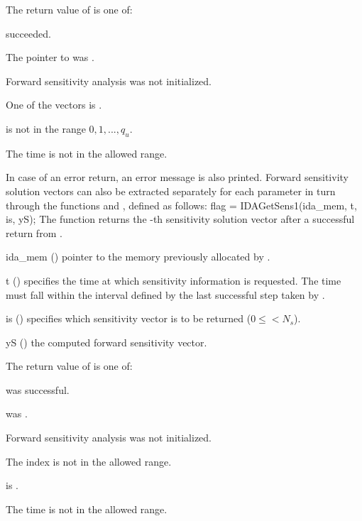 {
  The return value  of  is one of:
  \begin{args}
  \item[\Id{IDA\_SUCCESS}] 
     succeeded.
  \item[\Id{IDA\_MEM\_NULL}] 
    The pointer to  was .
  \item[\Id{IDA\_NO\_SENS}] 
    Forward sensitivity analysis was not initialized.
  \item[\Id{IDA\_BAD\_DKY}] 
    One of the vectors  is .
  \item[\Id{IDA\_BAD\_K}]
     is not in the range $0, 1, ..., q_u$.
  \item[\Id{IDA\_BAD\_T}] 
    The time  is not in the allowed range.
  \end{args}
}
{
  In case of an error return, an error message is also printed.  
}
Forward sensitivity solution vectors can also be extracted separately for 
each parameter in turn through the functions  and
, defined as follows:
{
  flag = IDAGetSens1(ida\_mem, t, is, yS);
}
{
  The function  returns the -th sensitivity solution vector
  after a successful return from .
}
{
  \begin{args}
  \item[ida\_mem] ()
    pointer to the memory previously allocated by .
  \item[t] ()
    specifies the time at which sensitivity information is 
    requested. The time  must fall within the interval defined by the last 
    successful step taken by {\idas}.
  \item[is] () specifies which sensitivity vector is to be returned
    ($0\le$$< N_s$).
  \item[yS] ()
    the computed forward sensitivity vector.
  \end{args}
}
{
  The return value  of  is one of:
  \begin{args}
  \item[\Id{IDA\_SUCCESS}]
     was successful.
  \item[\Id{IDA\_MEM\_NULL}] 
     was .
  \item[\Id{IDA\_NO\_SENS}] 
    Forward sensitivity analysis was not initialized.
  \item[\Id{IDA\_BAD\_IS}]
    The index  is not in the allowed range.
  \item[\Id{IDA\_BAD\_DKY}] 
     is .
  \item[\Id{IDA\_BAD\_T}] 
    The time  is not in the allowed range.
  \end{args}
}
